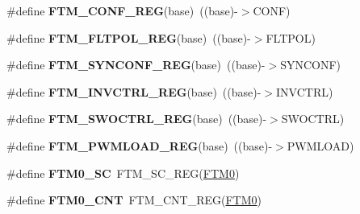 \begin{DoxyCompactItemize}
\item 
\#define {\bfseries F\+T\+M\+\_\+\+C\+O\+N\+F\+\_\+\+R\+EG}(base)~((base)-\/$>$C\+O\+NF)\hypertarget{group__FTM__Register__Accessor__Macros_gaa5a44ecf250b480be7446d8beed3cba1}{}\label{group__FTM__Register__Accessor__Macros_gaa5a44ecf250b480be7446d8beed3cba1}

\item 
\#define {\bfseries F\+T\+M\+\_\+\+F\+L\+T\+P\+O\+L\+\_\+\+R\+EG}(base)~((base)-\/$>$F\+L\+T\+P\+OL)\hypertarget{group__FTM__Register__Accessor__Macros_ga421b09e9029d887b487c4265469e4315}{}\label{group__FTM__Register__Accessor__Macros_ga421b09e9029d887b487c4265469e4315}

\item 
\#define {\bfseries F\+T\+M\+\_\+\+S\+Y\+N\+C\+O\+N\+F\+\_\+\+R\+EG}(base)~((base)-\/$>$S\+Y\+N\+C\+O\+NF)\hypertarget{group__FTM__Register__Accessor__Macros_gaf9fc200be2ca4557c5823f38b4f762ff}{}\label{group__FTM__Register__Accessor__Macros_gaf9fc200be2ca4557c5823f38b4f762ff}

\item 
\#define {\bfseries F\+T\+M\+\_\+\+I\+N\+V\+C\+T\+R\+L\+\_\+\+R\+EG}(base)~((base)-\/$>$I\+N\+V\+C\+T\+RL)\hypertarget{group__FTM__Register__Accessor__Macros_ga872c0021b76b69da07cb3347ac0d4ff4}{}\label{group__FTM__Register__Accessor__Macros_ga872c0021b76b69da07cb3347ac0d4ff4}

\item 
\#define {\bfseries F\+T\+M\+\_\+\+S\+W\+O\+C\+T\+R\+L\+\_\+\+R\+EG}(base)~((base)-\/$>$S\+W\+O\+C\+T\+RL)\hypertarget{group__FTM__Register__Accessor__Macros_gaa202334c413cca2cae51f8ec80d4e537}{}\label{group__FTM__Register__Accessor__Macros_gaa202334c413cca2cae51f8ec80d4e537}

\item 
\#define {\bfseries F\+T\+M\+\_\+\+P\+W\+M\+L\+O\+A\+D\+\_\+\+R\+EG}(base)~((base)-\/$>$P\+W\+M\+L\+O\+AD)\hypertarget{group__FTM__Register__Accessor__Macros_ga957410122c30463c8040dad4ae20f1e4}{}\label{group__FTM__Register__Accessor__Macros_ga957410122c30463c8040dad4ae20f1e4}

\item 
\#define {\bfseries F\+T\+M0\+\_\+\+SC}~F\+T\+M\+\_\+\+S\+C\+\_\+\+R\+EG(\hyperlink{group__FTM__Peripheral__Access__Layer_gac20d96b96f80ded87aa187f7519699ee}{F\+T\+M0})\hypertarget{group__FTM__Register__Accessor__Macros_gaa8cb4b7bcccc202d9256a35e2557c359}{}\label{group__FTM__Register__Accessor__Macros_gaa8cb4b7bcccc202d9256a35e2557c359}

\item 
\#define {\bfseries F\+T\+M0\+\_\+\+C\+NT}~F\+T\+M\+\_\+\+C\+N\+T\+\_\+\+R\+EG(\hyperlink{group__FTM__Peripheral__Access__Layer_gac20d96b96f80ded87aa187f7519699ee}{F\+T\+M0})\hypertarget{group__FTM__Register__Accessor__Macros_ga8049141666e13721ffe63b8211198740}{}\label{group__FTM__Register__Accessor__Macros_ga8049141666e13721ffe63b8211198740}


\end{DoxyCompactItemize}
